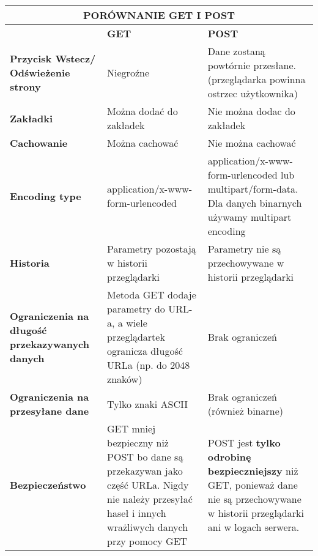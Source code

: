 \documentclass[../main.tex]{subfiles}
\begin{document}
    \begin{table}[H]
        \begin{center}
            \begin{tabular}{|p{4cm}|p{6cm}|p{6cm}|}
                \hline
                \multicolumn{3}{|c|}{\textbf{PORÓWNANIE GET I POST}}\\
                \hline
                &\textbf{GET} & \textbf{POST}\\
                \hline
                \hline
                \textbf{Przycisk Wstecz/ Odświeżenie strony} & Niegroźne &
                Dane zostaną powtórnie przesłane. (przeglądarka powinna ostrzec użytkownika)\\
                \hline
                \textbf{Zakładki} & Można dodać do zakładek & Nie można dodac do zakładek\\
                \hline
                \textbf{Cachowanie} & Można cachować & Nie można cachować\\
                \hline
                \textbf{Encoding type} & application/x-www-form-urlencoded &
                application/x-www-form-urlencoded lub multipart/form-data. Dla danych binarnych używamy multipart
                encoding\\
                \hline
                \textbf{Historia} & Parametry pozostają w historii przeglądarki & Parametry nie są przechowywane w historii
                przeglądarki\\
                \hline
                \textbf{Ograniczenia na długość przekazywanych danych} & Metoda GET dodaje parametry do URL-a, a wiele
                przeglądartek ogranicza długość URLa (np. do 2048 znaków) & Brak ograniczeń\\
                \hline
                \textbf{Ograniczenia na przesyłane dane} & Tylko znaki ASCII & Brak ograniczeń (również binarne)\\
                \hline
                \textbf{Bezpieczeństwo} & GET mniej bezpieczny niż POST bo dane są przekazywan jako część URLa.
                Nigdy nie należy przesyłać haseł i innych wrażliwych danych przy pomocy GET &
                POST jest \textbf{tylko odrobinę bezpieczniejszy} niż GET, ponieważ dane nie są przechowywane w historii
                przeglądarki ani w logach serwera.\\
                \hline
            \end{tabular}
        \end{center}
    \end{table}
\end{document}
